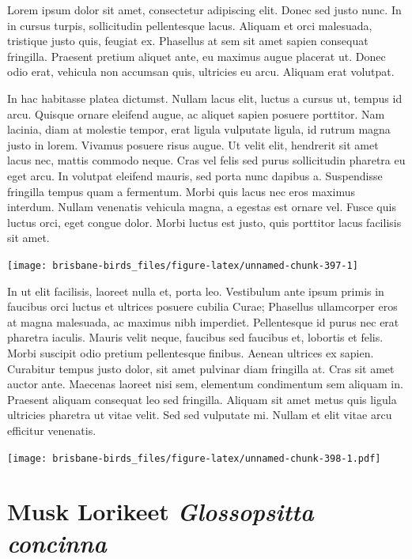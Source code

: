 \documentclass[]{book}
\let\origfigure\figure
\let\endorigfigure\endfigure
\renewenvironment{figure}[1][2] {
  \expandafter\origfigure\expandafter[H]
} {
  \endorigfigure
}
\begin{document}
Lorem ipsum dolor sit amet, consectetur adipiscing elit. Donec sed justo
nunc. In in cursus turpis, sollicitudin pellentesque lacus. Aliquam et
orci malesuada, tristique justo quis, feugiat ex. Phasellus at sem sit
amet sapien consequat fringilla. Praesent pretium aliquet ante, eu
maximus augue placerat ut. Donec odio erat, vehicula non accumsan quis,
ultricies eu arcu. Aliquam erat volutpat.

In hac habitasse platea dictumst. Nullam lacus elit, luctus a cursus ut,
tempus id arcu. Quisque ornare eleifend augue, ac aliquet sapien posuere
porttitor. Nam lacinia, diam at molestie tempor, erat ligula vulputate
ligula, id rutrum magna justo in lorem. Vivamus posuere risus augue. Ut
velit elit, hendrerit sit amet lacus nec, mattis commodo neque. Cras vel
felis sed purus sollicitudin pharetra eu eget arcu. In volutpat eleifend
mauris, sed porta nunc dapibus a. Suspendisse fringilla tempus quam a
fermentum. Morbi quis lacus nec eros maximus interdum. Nullam venenatis
vehicula magna, a egestas est ornare vel. Fusce quis luctus orci, eget
congue dolor. Morbi luctus est justo, quis porttitor lacus facilisis sit
amet.

\begin{figure}
\texttt{[image: brisbane-birds\_files/figure-latex/unnamed-chunk-397-1]} \caption{insert figure caption}\label{fig:unnamed-chunk-397}
\end{figure}

In ut elit facilisis, laoreet nulla et, porta leo. Vestibulum ante ipsum
primis in faucibus orci luctus et ultrices posuere cubilia Curae;
Phasellus ullamcorper eros at magna malesuada, ac maximus nibh
imperdiet. Pellentesque id purus nec erat pharetra iaculis. Mauris velit
neque, faucibus sed faucibus et, lobortis et felis. Morbi suscipit odio
pretium pellentesque finibus. Aenean ultrices ex sapien. Curabitur
tempus justo dolor, sit amet pulvinar diam fringilla at. Cras sit amet
auctor ante. Maecenas laoreet nisi sem, elementum condimentum sem
aliquam in. Praesent aliquam consequat leo sed fringilla. Aliquam sit
amet metus quis ligula ultricies pharetra ut vitae velit. Sed sed
vulputate mi. Nullam et elit vitae arcu efficitur venenatis.

\begin{figure}
\centering
\texttt{[image: brisbane-birds\_files/figure-latex/unnamed-chunk-398-1.pdf]}
\caption{\label{fig:unnamed-chunk-398}insert figure caption}
\end{figure}

\section{\texorpdfstring{Musk Lorikeet \emph{Glossopsitta
concinna}}{Musk Lorikeet Glossopsitta concinna}}\label{musk-lorikeet-glossopsitta-concinna}
\end{document}
